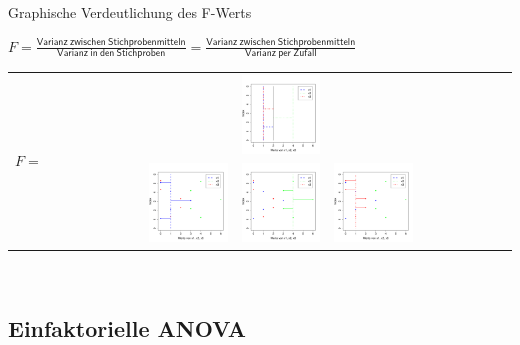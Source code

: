 \begin{frame}
  {Graphische Verdeutlichung des F-Werts}
  
  \begin{center}
    \alert{$F=\frac{\mathsf{Varianz\ zwischen\ Stichprobenmitteln}}{\mathsf{Varianz\ in\ den\ Stichproben}}=\frac{\mathsf{Varianz\ zwischen\ Stichprobenmitteln}}{\mathsf{Varianz\ per\ Zufall}}$}\\
    \begin{tabular}[h!]{cc}
      \multirow{2}{*}{$F=$} & \includegraphics[width=0.175\textwidth]{graphics/anova_var_between} \\\cline{2-2}
      & \includegraphics[width=0.175\textwidth]{graphics/anova_var_x1}\ \raisebox{1.25cm}{+}\ \includegraphics[width=0.175\textwidth]{graphics/anova_var_x2}\ \raisebox{1.25cm}{+}\ \includegraphics[width=0.175\textwidth]{graphics/anova_var_x3} \\
    \end{tabular}\\
    \Zeile
  \end{center}
\end{frame}

\subsection{Einfaktorielle ANOVA}

